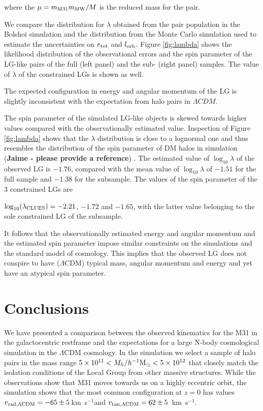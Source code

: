 \documentclass{emulateapj}
\newcommand{\kms}{\,km~s$^{-1}$}
\newcommand{\hMsun}{{\ifmmode{h^{-1}{\rm {M_{\odot}}}}\else{$h^{-1}{\rm{M_{\odot}}}$}\fi}}
\begin{document}
where the $\mu=m_{\rm M31}m_{\rm MW}/M$ is the reduced mass for the pair.


We compare the distribution for  $\lambda$ obtained from the pair population in the Bolshoi simulation and the distribution from the 
Monte Carlo
simulation used to estimate the uncertainties on $e_{\rm tot}$ and $l_{\rm orb}$. 
Figure \ref{fig:lambda} shows the likelihood distribution of the observational errors and the spin parameter of the LG-like pairs of the full (left panel) and the sub- (right panel) samples.  The value of $\lambda$ of the constrained LGs is shown as well. 

The expected configuration in energy and angular momentum of the LG is slightly inconsistent with the expectation from halo pairs in $\Lambda CDM$. 

The spin parameter of the simulated LG-like objects is skewed towards higher values compared with the observationally estimated value. 
Inspection of Figure \ref{fig:lambda} shows that the $\lambda$ distribution is close to a lognormal one and thus resembles the distribution of the spin parameter of DM halos in simulation ({\bf Jaime - please provide a reference}) . 
The estimated value of $\log_{10}\lambda$ of the observed LG is $-1.76$, compared with the mean value of 
 $\log_{10}\lambda$ of $-1.51$ for the full sample and $-1.38$ for the subsample. The values of the spin parameter of the 3 constrained LGs are

$\log_{10}(\lambda_{\rm CLUES})=-2.21$, $-1.72$ and $-1.65$, with the latter value belonging to the sole constrained LG of the subsample. 

% 
It follows that the observationally estimated energy and angular momentum and the estimated spin parameter impose similar constraints on the simulations and the standard model of cosmology. 
This implies that the observed LG does not conspire to have  ($\Lambda$CDM) typical mass, angular momentum and energy and yet have an atypical spin parameter.



\section{Conclusions}
We have presented a comparison between the observed kinematics for the M31 in the galactocentric restframe and the expectations for a large N-body cosmological simulation in the $\Lambda$CDM cosmology. In the simulation we select a sample of halo pairs in the mass range $5\times 10^{11}<M_{h}/\hMsun<5\times 10^{12}$ that closely match the isolation conditions of the Local Group from other massive structures. While the observations show that M31 moves towards us 
on a highly eccentric orbit,%
 the simulation shows that the most common configuration at $z=0$ has values $v_{\rm rad, \Lambda CDM}=-65\pm5$\kms and $v_{\rm tan, \Lambda CDM}=62\pm5$ \kms. 
\end{document}
